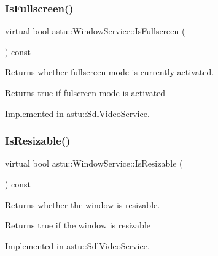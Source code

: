 \mbox{\label{classastu_1_1WindowService_aa94ce60d1e8dd7484d364b65c25be1ca}} 
\subsubsection{\texorpdfstring{Is\+Fullscreen()}{IsFullscreen()}}
{\footnotesize\ttfamily virtual bool astu\+::\+Window\+Service\+::\+Is\+Fullscreen (\begin{DoxyParamCaption}{ }\end{DoxyParamCaption}) const\hspace{0.3cm}{\ttfamily [pure virtual]}}

Returns whether fullscreen mode is currently activated.

\begin{DoxyReturn}{Returns}
{\ttfamily true} if fulscreen mode is activated 
\end{DoxyReturn}


Implemented in \hyperlink{classastu_1_1SdlVideoService_ae2be9aedf021799802cf7d1feaef7dfc}{astu\+::\+Sdl\+Video\+Service}.

\mbox{\label{classastu_1_1WindowService_a277954f71dd019b3ffc5d37df3f8b3af}} 
\subsubsection{\texorpdfstring{Is\+Resizable()}{IsResizable()}}
{\footnotesize\ttfamily virtual bool astu\+::\+Window\+Service\+::\+Is\+Resizable (\begin{DoxyParamCaption}{ }\end{DoxyParamCaption}) const\hspace{0.3cm}{\ttfamily [pure virtual]}}

Returns whether the window is resizable.

\begin{DoxyReturn}{Returns}
{\ttfamily true} if the window is resizable 
\end{DoxyReturn}


Implemented in \hyperlink{classastu_1_1SdlVideoService_a335762da99b341205b8bf759a0b57c64}{astu\+::\+Sdl\+Video\+Service}.

